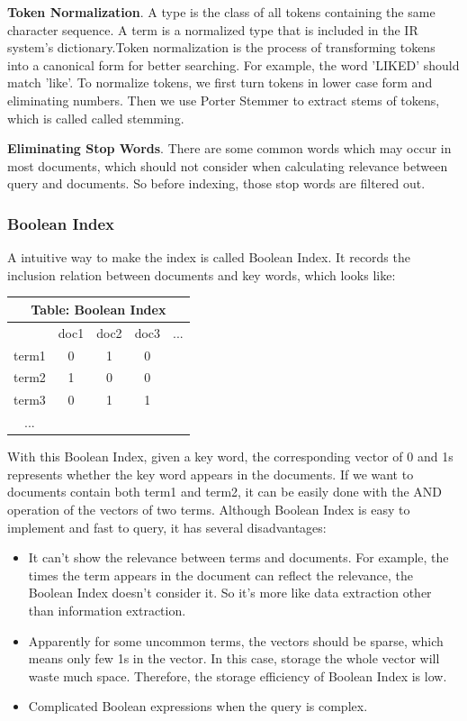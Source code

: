 \documentclass[10pt,journal,compsoc]{IEEEtran}
\begin{document}
\textbf{Token Normalization}. A type is the class of all tokens containing the same character sequence. A term is a normalized type that is included in the IR system's dictionary.Token normalization is the process of transforming tokens into a canonical form for better searching. For example, the word 'LIKED' should match 'like'. To normalize tokens, we first turn tokens in lower case form and eliminating numbers. Then we use Porter Stemmer to extract stems of tokens, which is called called stemming.

\textbf{Eliminating Stop Words}. There are some common words which may occur in most documents, which should not consider when calculating relevance between query and documents. So before indexing, those stop words are filtered out.


\subsubsection{Boolean Index}
A intuitive way to make the index is called Boolean Index. It records the inclusion relation between documents and key words, which looks like:
\begin{table}[H]
\centering
\begin{tabular}{ccccc}
\toprule
\multicolumn{5}{c}{\textbf{Table: Boolean Index}} \\
\midrule
 & doc1   & doc2 & doc3 & ...        \\
term1 & 0 & 1 & 0 &             \\
term2 & 1 & 0 & 0 &             \\
term3 & 0 & 1 & 1 &             \\
... & & & \\
\bottomrule
\end{tabular}
\end{table}
With this Boolean Index\cite{greengrass2000information}, given a key word, the corresponding vector of 0 and 1s represents whether the key word appears in the documents. If we want to documents contain both term1 and term2, it can be easily done with the AND operation of the vectors of two terms. Although Boolean Index is easy to implement and fast to query, it has several disadvantages:
\begin{itemize}
    \item It can't show the relevance between terms and documents. For example, the times the term appears in the document can reflect the relevance, the Boolean Index doesn't consider it. So it's more like data extraction other than information extraction.
    \item Apparently for some uncommon terms, the vectors should be sparse, which means only few 1s in the vector. In this case, storage the whole vector will waste much space. Therefore, the storage efficiency of Boolean Index is low.
    \item Complicated Boolean expressions when the query is complex. 
\end{itemize}
\end{document}
